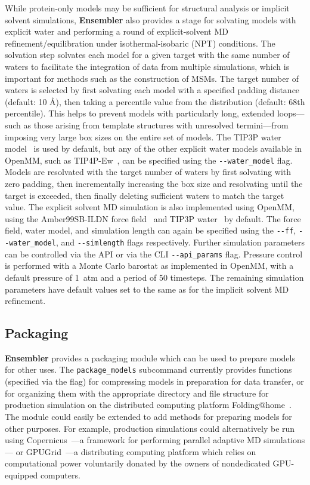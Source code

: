 \documentclass[aps,prl,preprint,nofootinbib,superscriptaddress,linenumbers]{revtex4-1}
\begin{document}
While protein-only models may be sufficient for structural analysis or implicit solvent simulations, {\bf Ensembler} also provides a stage for solvating models with explicit water and performing a round of explicit-solvent MD refinement/equilibration under isothermal-isobaric (NPT) conditions.
The solvation step solvates each model for a given target with the same number of waters to facilitate the integration of data from multiple simulations, which is important for methods such as the construction of MSMs.
The target number of waters is selected by first solvating each model with a specified padding distance (default: 10 \AA), then taking a percentile value from the distribution (default: 68th percentile).
This helps to prevent models with particularly long, extended loops---such as those arising from template structures with unresolved termini---from imposing very large box sizes on the entire set of models.
The TIP3P water model~\cite{tip3p} is used by default, but any of the other explicit water models available in OpenMM, such as TIP4P-Ew~\cite{tip4p-ew}, can be specified using the {\tt -{}-water\_model} flag.
Models are resolvated with the target number of waters by first solvating with zero padding, then incrementally increasing the box size and resolvating until the target is exceeded, then finally deleting sufficient waters to match the target value.
The explicit solvent MD simulation is also implemented using OpenMM, using the Amber99SB-ILDN force field~\cite{amber99sb-ildn} and TIP3P water~\cite{tip3p} by default.
The force field, water model, and simulation length can again be specified using the {\tt -{}-ff}, {\tt -{}-water\_model}, and {\tt -{}-simlength} flags respectively.
Further simulation parameters can be controlled via the API or via the CLI {\tt -{}-api\_params} flag.
Pressure control is performed with a Monte Carlo barostat as implemented in OpenMM, with a default pressure of 1~atm and a period of 50 timesteps.
The remaining simulation parameters have default values set to the same as for the implicit solvent MD refinement.

\subsection*{Packaging}

{\bf Ensembler} provides a packaging module which can be used to prepare models for other uses.
The {\tt package\_models} subcommand currently provides functions (specified via the  flag) for compressing models in preparation for data transfer, or for organizing them with the appropriate directory and file structure for production simulation on the distributed computing platform Folding@home~\cite{shirts-pande:science:2000:fah}.
The module could easily be extended to add methods for preparing models for other purposes.
For example, production simulations could alternatively be run using Copernicus~\cite{pronk:2011:copernicus,pronk:2015:copernicus}---a framework for performing parallel adaptive MD simulations--- or GPUGrid~\cite{buch:2010:gpugrid}---a distributing computing platform which relies on computational power voluntarily donated by the owners of nondedicated GPU-equipped computers.
\end{document}
